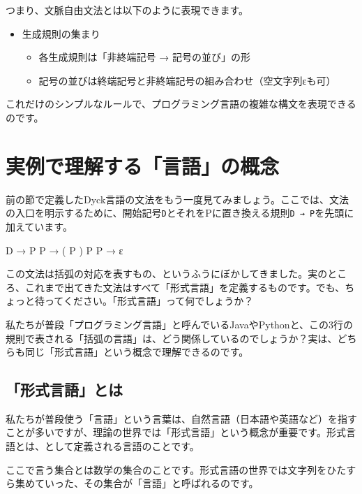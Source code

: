 つまり、文脈自由文法とは以下のように表現できます。

\begin{itemize}
\item
  生成規則の集まり

  \begin{itemize}
  \item
    各生成規則は「非終端記号 → 記号の並び」の形
  \item
    記号の並びは終端記号と非終端記号の組み合わせ（空文字列εも可）
  \end{itemize}
\end{itemize}

これだけのシンプルなルールで、プログラミング言語の複雑な構文を表現できるのです。

\section{実例で理解する「言語」の概念}

前の節で定義したDyck言語の文法をもう一度見てみましょう。ここでは、文法の入口を明示するために、開始記号\texttt{D}とそれをPに置き換える規則\texttt{D → P}を先頭に加えています。

\begin{codescreen}{}
D → P
P → ( P ) P
P → ε
\end{codescreen}

この文法は括弧の対応を表すもの、というふうにぼかしてきました。実のところ、これまで出てきた文法はすべて「形式言語」を定義するものです。でも、ちょっと待ってください。「形式言語」って何でしょうか？

私たちが普段「プログラミング言語」と呼んでいるJavaやPythonと、この3行の規則で表される「括弧の言語」は、どう関係しているのでしょうか？実は、どちらも同じ「形式言語」という概念で理解できるのです。

\subsection{「形式言語」とは}

私たちが普段使う「言語」という言葉は、自然言語（日本語や英語など）を指すことが多いですが、理論の世界では「形式言語」という概念が重要です。形式言語とは、として定義される言語のことです。

ここで言う集合とは数学の集合のことです。形式言語の世界では文字列をひたすら集めていった、その集合が「言語」と呼ばれるのです。

